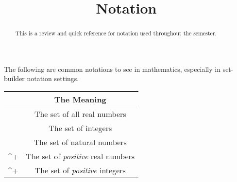 \documentclass{ximera}
\title{Notation}
\begin{document}
\begin{abstract}
This is a review and quick reference for notation used throughout the semester.
\end{abstract}
\maketitle




The following are common notations to see in mathematics, especially in set-builder notation settings.
\begin{center}
\begin{tabular}{ C c }
 & The Meaning \\ \hline
{} & The set of all real numbers\\
 & The set of integers\\
 & The set of natural numbers\\
^+ & The set of \textit{positive} real numbers \\
^+  & The set of \textit{positive} integers
\end{tabular}
\end{center}
    
    
\end{document}
